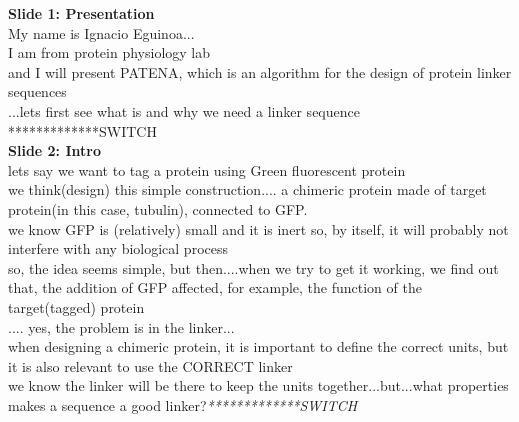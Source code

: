 \documentclass[a4paper,10pt]{article}
\begin{document}

\textbf{Slide 1: Presentation}\\
My name is Ignacio Eguinoa...\\
I am from protein physiology lab\\
and I will present PATENA, which is an algorithm for the design of protein linker sequences\\
...lets first see what is and why we need a linker sequence *************SWITCH \\



\textbf{Slide 2: Intro}\\
lets say we want to tag a protein using Green fluorescent protein\\ %
we think(design) this simple construction.... a chimeric protein made of target protein(in this case, tubulin), connected to GFP.\\
we know GFP is (relatively) small and it is inert so, by itself, it will probably not interfere with any biological process\\
so, the idea seems simple, but then....when we try to get it working, we find out that, the addition of GFP affected, for example, the function of the target(tagged) protein\\
.... yes, the problem is in the linker...\\
when designing a chimeric protein, it is important to define the correct units, but it is also relevant to use the CORRECT linker \\
we know the linker will be there to keep the units together...but...what properties makes a sequence a good linker?\textit{*************SWITCH } \\
\end{document}
